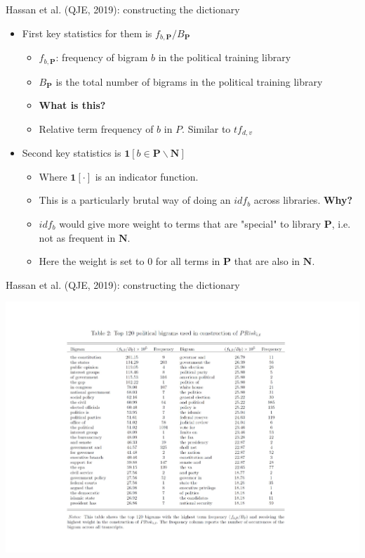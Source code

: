 \documentclass[english]{beamer}
\begin{document}
\begin{frame}{Hassan et al. (QJE, 2019): constructing the dictionary}
\begin{itemize}
\setlength{\itemsep}{1.2em}
\item First key statistics for them is $f_{b,\boldsymbol{P}}/B_{\boldsymbol{P}}$
\vspace{3pt}
\begin{itemize}
\setlength{\itemsep}{0.4em}
\item $f_{b,\boldsymbol{P}}$: frequency of bigram $b$ in the political training library
\item $B_{\boldsymbol{P}}$ is the total number of bigrams in the political training library
\item \textbf{What is this?}
\item Relative term frequency of $b$ in $P$. Similar to $tf_{d,v}$
\end{itemize}
\item Second key statistics is $\boldsymbol{1}\left[ b\in \boldsymbol{P} \backslash \boldsymbol{N}\right] $
\vspace{3pt}
\begin{itemize}
\setlength{\itemsep}{0.4em}
\item Where $\boldsymbol{1}\left[ \cdot \right] $ is an indicator function.
\item This is a particularly brutal way of doing an $idf_{b}$ across libraries. \textbf{Why?}
\item $idf_{b}$ would give more weight to terms that are "special" to library $\boldsymbol{P}$, i.e. not as frequent in $\boldsymbol{N.}$
\item Here the weight is set to 0 for all terms in $\boldsymbol{P}$ that are also in $\boldsymbol{N.}$
\end{itemize}
\end{itemize}
\end{frame}

\begin{frame}{Hassan et al. (QJE, 2019): constructing the dictionary}
\vspace{-7pt}
\begin{center}
\includegraphics[scale=0.5]{Images/hassan_et_al_table1.pdf}
\end{center}
\end{frame}
\end{document}
